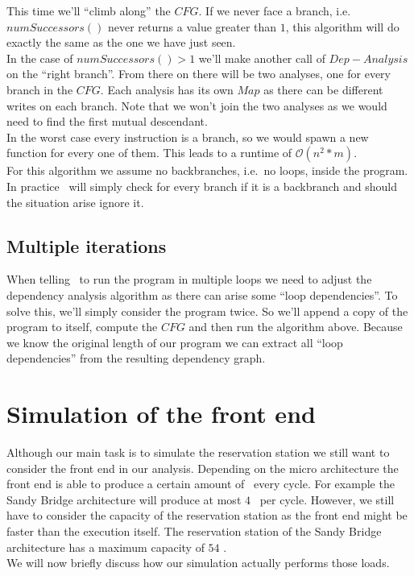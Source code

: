 This time we'll ``climb along'' the $CFG$. If we never face a branch, i.e.\ $numSuccessors()$ never returns a value greater than $1$, this algorithm will do exactly the same as the one we have just seen.\\
In the case of $numSuccessors() > 1$ we'll make another call of $Dep-Analysis$ on the ``right branch''. From there on there will be two analyses, one for every branch in the $CFG$. Each analysis has its own $Map$ as there can be different writes on each branch. Note that we won't join the two analyses as we would need to find the first mutual descendant.\\
In the worst case every instruction is a branch, so we would spawn a new function for every one of them. This leads to a runtime of $\mathcal{O}(n^2*m)$.\\
For this algorithm we assume no backbranches, i.e.\ no loops, inside the program. In practice \suaca\ will simply check for every branch if it is a backbranch and should the situation arise ignore it.


\subsection{Multiple iterations}

When telling \suaca\ to run the program in multiple loops we need to adjust the dependency analysis algorithm as there can arise some ``loop dependencies''. To solve this, we'll simply consider the program twice. So we'll append a copy of the program to itself, compute the $CFG$ and then run the algorithm above. Because we know the original length of our program we can extract all ``loop dependencies'' from the resulting dependency graph.


\section{Simulation of the front end}
\label{sec:simfrontend}

Although our main task is to simulate the reservation station we still want to consider the front end in our analysis. Depending on the micro architecture the front end is able to produce a certain amount of \microops\ every cycle. For example the Sandy Bridge architecture will produce at most $4$ \microops\ per cycle. However, we still have to consider the capacity of the reservation station as the front end might be faster than the execution itself. The reservation station of the Sandy Bridge architecture has a maximum capacity of $54$ \microops.\\
We will now briefly discuss how our simulation actually performs those loads.

